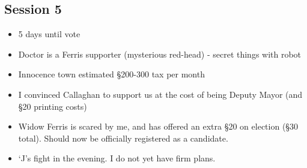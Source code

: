 \documentclass[10pt,a4paper]{article}
\begin{document}
\subsection*{Session 5}

  \begin{itemize}
    \item 5 days until vote
    \item Doctor is a Ferris supporter (mysterious red-head) - secret things with robot
    \item Innocence town estimated §200-300 tax per month
    \item I convinced Callaghan to support us at the cost of being Deputy Mayor (and §20 printing costs)
    \item Widow Ferris is scared by me, and has offered an extra §20 on election (§30 total). Should now be officially registered as a candidate.
    \item `J's fight in the evening. I do not yet have firm plans.
  \end{itemize}
\end{document}
